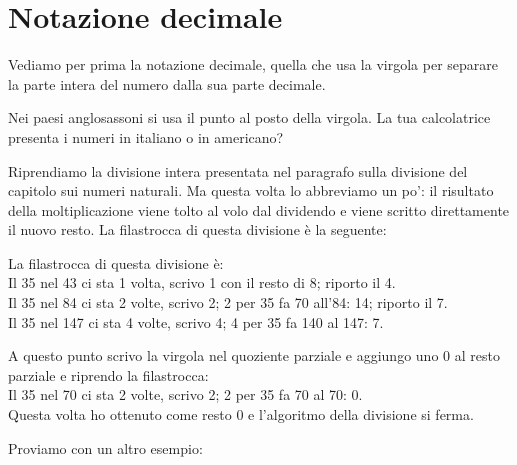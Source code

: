 \section{Notazione decimale}
\label{sec:razionali_notazione_decimale}

Vediamo per prima la notazione decimale, quella che usa la virgola per 
separare la parte intera del numero dalla sua parte decimale.

\begin{osservazione}
 Nei paesi anglosassoni si usa il punto al posto della virgola. La tua 
calcolatrice presenta i numeri in italiano o in americano?
\end{osservazione}

Riprendiamo la divisione intera presentata nel paragrafo sulla divisione 
del capitolo sui numeri naturali.
Ma questa volta lo abbreviamo un po': il risultato della moltiplicazione 
viene tolto al volo dal dividendo e viene scritto direttamente il nuovo 
resto. 
La filastrocca di questa divisione è la seguente:

\begin{minipage}[]{.59\textwidth}
\begin{center}\end{center}
\end{minipage}
\begin{minipage}[]{.39\textwidth}
La filastrocca di questa divisione è:\\
Il 35 nel 43 ci sta 1 volta, scrivo 1 con il resto di 8; riporto il 4.\\
Il 35 nel 84 ci sta 2 volte, scrivo 2; 2 per 35 fa 70 all'84: 14; riporto 
il 7.\\
Il 35 nel 147 ci sta 4 volte, scrivo 4; 4 per 35 fa 140 al 147: 7.\\
\end{minipage}

A questo punto scrivo la virgola nel quoziente parziale e aggiungo uno 0 al 
resto parziale e riprendo la filastrocca:\\
Il 35 nel 70 ci sta 2 volte, scrivo 2; 2 per 35 fa 70 al 70: 0.\\
Questa volta ho ottenuto come resto 0 e l'algoritmo della divisione si 
ferma.


Proviamo con un altro esempio:

